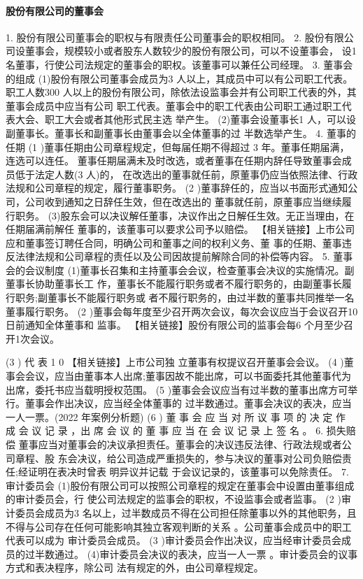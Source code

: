 \documentclass[UTF8,12pt]{ctexart}
\numberwithin{equation}{section} %
\numberwithin{figure}{section}
\numberwithin{table}{section}
\begin{document}
	\paragraph{股份有限公司的董事会}
	1. 股份有限公司董事会的职权与有限责任公司董事会的职权相同。
	2. 股份有限公司设董事会，规模较小或者股东人数较少的股份有限公司，可以不设董事会， 设1名董事，行使公司法规定的董事会的职权。该董事可以兼任公司经理。
	3. 董事会的组成
	(1)股份有限公司董事会成员为3 人以上，其成员中可以有公司职工代表。职工人数300 人以上的股份有限公司，除依法设监事会并有公司职工代表的外，其董事会成员中应当有公司 职工代表。董事会中的职工代表由公司职工通过职工代表大会、职工大会或者其他形式民主选 举产生。
	(2)董事会设董事长1 人，可以设副董事长。董事长和副董事长由董事会以全体董事的过 半数选举产生。
	4. 董事的任期
	(1 )董事任期由公司章程规定，但每届任期不得超过 3 年。董事任期届满，连选可以连任。 董事任期届满未及时改选，或者董事在任期内辞任导致董事会成员低于法定人数(3 人)的， 在改选出的董事就任前，原董事仍应当依照法律、行政法规和公司章程的规定，履行董事职务。 (2 )董事辞任的，应当以书面形式通知公司，公司收到通知之日辞任生效，但在改选出的 董事就任前，原董事应当继续履行职务。 (3)股东会可以决议解任董事，决议作出之日解任生效。无正当理由，在任期届满前解任 董事的，该董事可以要求公司予以赔偿。
	【相关链接】上市公司应和董事签订聘任合同，明确公司和董事之间的权利义务、董 事的任期、董事违反法律法规和公司章程的责任以及公司因故提前解除合同的补偿等内容。
	5. 董事会的会议制度 (1)董事长召集和主持董事会会议，检查董事会决议的实施情况。副董事长协助董事长工 作，董事长不能履行职务或者不履行职务的，由副董事长履行职务;副董事长不能履行职务或 者不履行职务的，由过半数的董事共同推举一名董事履行职务。
	(2 )董事会每年度至少召开两次会议，每次会议应当于会议召开10 日前通知全体董事和 监事。
	【相关链接】股份有限公司的监事会每6 个月至少召开1次会议。
	
	(3 ) 代 表 1 0 %
	【相关链接】上市公司独 立董事有权提议召开董事会会议。
	(4 )董事会会议，应当由董事本人出席;董事因故不能出席，可以书面委托其他董事代为 出席，委托书应当载明授权范围。
	(5 )董事会会议应当有过半数的董事出席方可举行。董事会作出决议，应当经全体董事的 过半数通过。董事会决议的表决，应当一人一票。(2022 年案例分析题)
	(6 ) 董 事 会 应 当 对 所 议 事 项 的 决 定 作 成 会 议 记 录 ，出 席 会 议 的 董 事 应 当 在 会 议 记 录 上 签 名 。 6. 损失赔偿 董事应当对董事会的决议承担责任。董事会的决议违反法律、行政法规或者公司章程、股 东会决议，给公司造成严重损失的，参与决议的董事对公司负赔偿责任;经证明在表决时曾表 明异议并记载 于会议记录的，该董事可以免除责任。
	7. 审计委员会 (1)股份有限公司可以按照公司章程的规定在董事会中设置由董事组成的审计委员会，行 使公司法规定的监事会的职权，不设监事会或者监事。
	(2 )审计委员会成员为3 名以上，过半数成员不得在公司担任除董事以外的其他职务，且 不得与公司存在任何可能影响其独立客观判断的关系 。公司董事会成员中的职工代表可以成为 审计委员会成员。
	(3 )审计委员会作出决议，应当经审计委员会成员的过半数通过。 (4)审计委员会决议的表决，应当一人一票 。审计委员会的议事方式和表决程序，除公司 法有规定的外，由公司章程规定。
\end{document}

